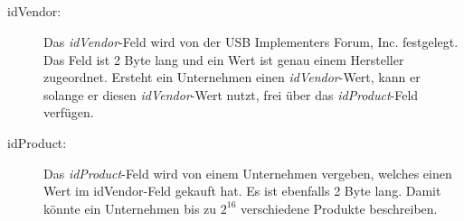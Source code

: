 $ $\\ \\ \\ \\ \\
\begin{description}
	\item[idVendor: ] Das \textit{idVendor}-Feld wird von der USB Implementers Forum, Inc. festgelegt. Das Feld ist 2 Byte lang und ein Wert ist genau einem Hersteller zugeordnet. Ersteht ein Unternehmen einen \textit{idVendor}-Wert, kann er solange er diesen \textit{idVendor}-Wert nutzt, frei über das \textit{idProduct}-Feld verfügen.
	\item[idProduct: ] Das \textit{idProduct}-Feld wird von einem Unternehmen vergeben, welches einen Wert im idVendor-Feld gekauft hat. Es ist ebenfalls 2 Byte lang. Damit könnte ein Unternehmen bis zu $2^{16}$ verschiedene Produkte beschreiben.
	
\end{description}